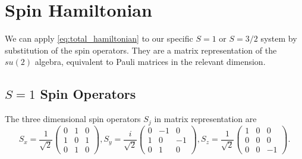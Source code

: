 \section{Spin Hamiltonian}
We can apply \eqref{eq:total_hamiltonian} to our specific $S=1$ or $S=3/2$ system by substitution of the spin operators. They are a matrix representation of the $su(2)$ algebra, equivalent to Pauli matrices in the relevant dimension.
\subsection{$S=1$ Spin Operators}
The three dimensional  spin operators $S_j$ in matrix representation are
\begin{equation}
	S_x = \frac{1}{\sqrt{2}} \begin{pmatrix}
		0 & 1 & 0 \\
		1 & 0 & 1 \\
		0 & 1 & 0
	\end{pmatrix},
	S_y = \frac{i}{\sqrt{2}} \begin{pmatrix}
		0 & -1 & 0  \\
		1 & 0  & -1 \\
		0 & 1  & 0
	\end{pmatrix},
	S_z = \frac{1}{\sqrt{2}} \begin{pmatrix}
		1 & 0 & 0  \\
		0 & 0 & 0  \\
		0 & 0 & -1
	\end{pmatrix}.
	\label{eq:s1_spin_operators}
\end{equation}


